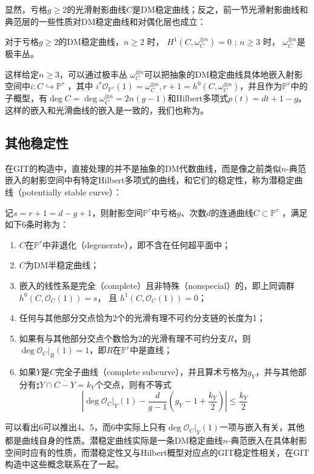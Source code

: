 显然，亏格$ g\geqslant2 $的光滑射影曲线$ C $是DM稳定曲线；反之，前一节光滑射影曲线和典范层的一些性质对DM稳定曲线和对偶化层也成立：
\begin{proposition}
	对于亏格$ g \geqslant2$的DM稳定曲线，$ n\geqslant 2$ 时， $H^1(C,\omega_C^{\otimes n})=0$ ; $n\geqslant 3$ 时， $ \omega_C^{\otimes n}$是极丰丛。
\end{proposition} 

这样给定$ n\geqslant 3 $，可以通过极丰丛 $ \omega_C^{\otimes n}$可以把抽象的DM稳定曲线具体地嵌入射影空间中$ i:C\hookrightarrow \mathbb{P}^r$ ，其中 $i^*\mathscr{O}_{\mathbb{P}^r}(1)=\omega_C^{\otimes n},r+1=h^0(C,\omega_C^{\otimes n}) $，并且作为$ \mathbb{P}^r $中的子概型，有$ \deg C=\deg \omega_C^{\otimes n}= 2n(g-1)$和Hilbert多项式$ p(t)=dt+1-g $。这样的嵌入和光滑曲线的嵌入是一致的，我们也称为。\label{pluricanonical}


\subsection{其他稳定性}
在GIT的构造中，直接处理的并不是抽象的DM代数曲线，而是像之前类似$ n $-典范嵌入的射影空间中有特定Hilbert多项式的曲线，和它们的稳定性，称为潜稳定曲线（potentially stable curve）：
\begin{definition}
	记$ s=r+1=d-g+1 $，则射影空间$ \mathbb{P}^r $中亏格$ g $、次数$ d $的连通曲线$ C\subset \mathbb{P}^r$ ，满足如下6条时称为：
	\begin{enumerate}
		\item $ C $在$ \mathbb{P}^r $中非退化（degenerate），即不含在任何超平面中；
		\item $ C $为DM半稳定曲线；
		\item 嵌入的线性系是完全（complete）且非特殊（nonspecial）的，即上同调群$ h^0(C,\mathscr{O}_C(1))=s$， 且 $h^1(C,\mathscr{O}_C(1))=0 $；
		\item 任何与其他部分交点恰为2个的光滑有理不可约分支链的长度为1；
		\item 如果有与其他部分交点个数恰为2的光滑有理不可约分支$ R $，则$ \deg \mathscr{O}_C|_R (1)=1$，即$ R $在$ \mathbb{P}^r $中是直线；
		\item 如果$ Y $是$ C $完全子曲线（complete subcurve），并且算术亏格为$ g_Y $，并与其他部分有$\sharp Y\cap \overline{C-Y}=k_Y $个交点，则有不等式
		$$ \left|\deg\mathscr{O}_C|_Y(1)-\frac{d}{g-1}(g_Y-1+\frac{k_Y}{2})  \right |\leqslant\frac{k_Y}{2}  $$
	\end{enumerate}
\end{definition}
可以看出6可以推出4、5，而6中实际上只有$ \deg\mathscr{O}_C|_Y(1) $一项与嵌入有关，其他都是曲线自身的性质。潜稳定曲线实际是一条DM稳定曲线$ n $-典范嵌入在具体射影空间时应有的性质，而潜稳定性又与Hilbert概型对应点的GIT稳定性相关，在GIT构造中这些概念联系在了一起。

